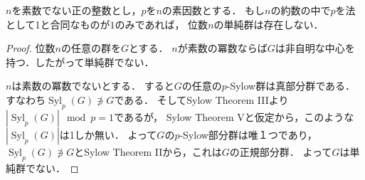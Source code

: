 \documentclass[a4paper]{jsarticle}
\newcommand{\Syl}{\operatorname{Syl}}
\begin{document}
    \begin{Prop}
        $n$を素数でない正の整数とし，$p$を$n$の素因数とする．
        もし$n$の約数の中で$p$を法として1と合同なものが$1$のみであれば，
        位数$n$の単純群は存在しない．
    \end{Prop}
    \begin{proof}
        位数$n$の任意の群を$G$とする．
        $n$が素数の冪数ならば$G$は非自明な中心を持つ．したがって単純群でない．

        $n$は素数の冪数でないとする．
        すると$G$の任意の$p$-Sylow群は真部分群である．すなわち$\Syl_p(G) \not \ni G$である．
        そしてSylow Theorem IIIより$|\Syl_p(G)| \mod p=1$であるが，
        Sylow Theorem Vと仮定から，このような$|\Syl_p(G)|$は1しか無い．
        よって$G$の$p$-Sylow部分群は唯１つであり，
        $\Syl_p(G) \not \ni G$とSylow Theorem IIから，これは$G$の正規部分群．
        よって$G$は単純群でない．
    \end{proof}
\end{document}
